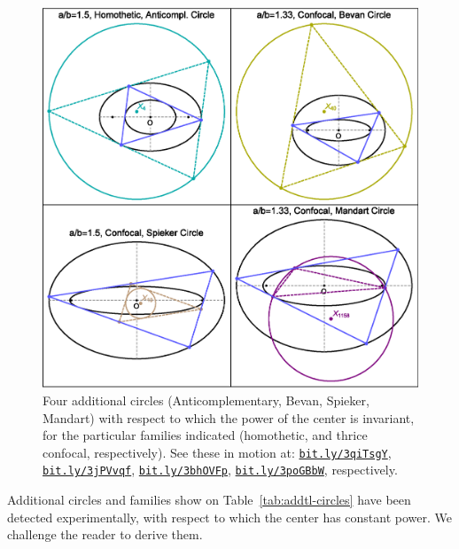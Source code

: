 \begin{figure}
 \centering
 \includegraphics[width=.8\textwidth]{pics/0160_four_new_constant_power_circles.eps}
 \caption{Four additional circles (Anticomplementary, Bevan, Spieker, Mandart) with respect to which the power of the center is invariant, for the particular families indicated (homothetic, and thrice confocal, respectively). See these in motion at: \href{https://bit.ly/3qiTsgY}{\texttt{bit.ly/3qiTsgY}}, \href{https://bit.ly/3jPVvqf}{\texttt{bit.ly/3jPVvqf}}, \href{https://bit.ly/3bhOVFp}{\texttt{bit.ly/3bhOVFp}}, \href{https://bit.ly/3poGBbW}{\texttt{bit.ly/3poGBbW}}, respectively.}
 \label{fig:four-more}
\end{figure}

Additional circles and families show on Table~\ref{tab:addtl-circles} have been detected experimentally, with respect to which the center has constant power. We challenge the reader to derive them.

